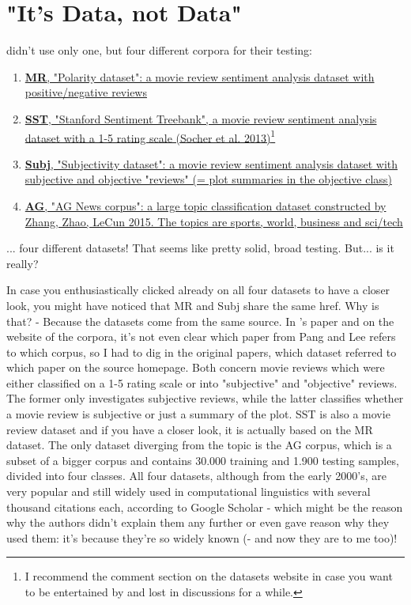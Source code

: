 \documentclass{article}
\begin{document}
\section{"It's Data, not Data"} \label{sec:data}
\cite{zhang2018} didn't use only one, but four different corpora for their testing:
\begin{enumerate}
    \item \href{http://www.cs.cornell.edu/people/pabo/movie-review-data/}{\textbf{MR}, "Polarity dataset": a movie review sentiment analysis dataset with positive/negative reviews \citep{pang-lee-2005}}
    \item \href{https://nlp.stanford.edu/sentiment/index.html}{\textbf{SST}, "Stanford Sentiment Treebank", a movie review sentiment analysis dataset with a 1-5 rating scale (Socher et al. 2013)\footnote{\href{https://nlp.stanford.edu/sentiment/index.html}{I recommend the comment section on the datasets website in case you want to be entertained by and lost in discussions for a while.}}}
    \item \href{http://www.cs.cornell.edu/people/pabo/movie-review-data/}{\textbf{Subj}, "Subjectivity dataset": a movie review sentiment analysis dataset with subjective and objective "reviews" (= plot summaries in the objective class) \citep{pang-lee-2004}}
    \item \href{http://nlpprogress.com/english/text_classification.html}{\textbf{AG}, "AG News corpus": a large topic classification dataset constructed by Zhang, Zhao, LeCun 2015. The topics are sports, world, business and sci/tech}
\end{enumerate}
... four different datasets! That seems like pretty solid, broad testing. But... is it really?\par
In case you enthusiastically clicked already on all four datasets to have a closer look, you might have noticed that MR and Subj share the same href. Why is that? - Because the datasets come from the same source. In \cite{zhang2018}'s paper and on the website of the corpora, it's not even clear which paper from Pang and Lee refers to which corpus, so I had to dig in the original papers, which dataset referred to which paper on the source homepage. Both concern movie reviews which were either classified on a 1-5 rating scale or into "subjective" and "objective" reviews. The former only investigates subjective reviews, while the latter classifies whether a movie review is subjective or just a summary of the plot. SST is also a movie review dataset and if you have a closer look, it is actually based on the MR dataset. The only dataset diverging from the topic is the AG corpus, which is a subset of a bigger corpus and contains 30.000 training and 1.900 testing samples, divided into four classes. All four datasets, although from the early 2000's, are very popular and still widely used in computational linguistics with several thousand citations each, according to Google Scholar - which might be the reason why the authors didn't explain them any further or even gave reason why they used them: it's because they're so widely known (- and now they are to me too)!
\end{document}
